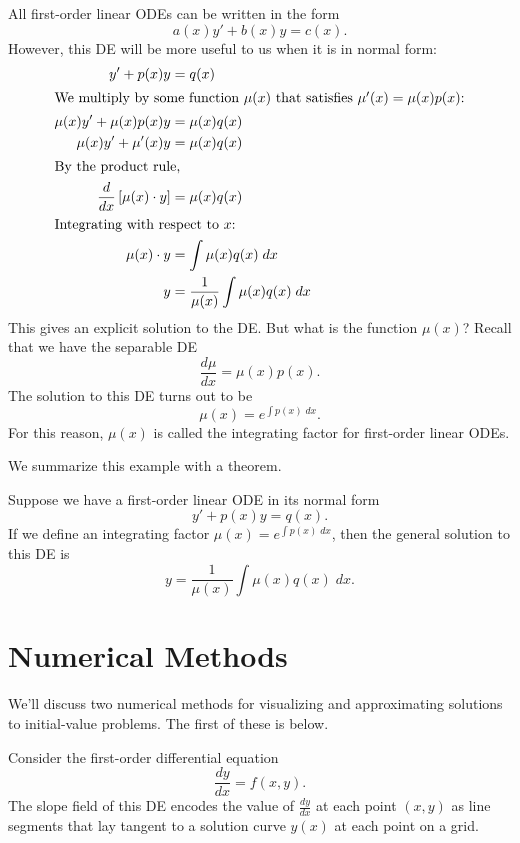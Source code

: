 \documentclass[../m82main.tex]{subfiles}
\begin{document}
\begin{example}
    All first-order linear ODEs can be written in the form
    \[ a(x)y' + b(x)y = c(x). \]
    However, this DE will be more useful to us when it is in normal form:
    \begin{align*}
        y' + p(x)y &= q(x) \\
        \intertext{We multiply by some function $\mu(x)$ that satisfies $\mu'(x) = \mu(x)p(x)$:}
        \mu(x)y' + \mu(x)p(x)y &= \mu(x)q(x) \\
        \mu(x)y' + \mu'(x)y &= \mu(x)q(x) \\
        \intertext{By the product rule,}
        \frac{d}{dx} \left[ \mu(x) \cdot y \right] &= \mu(x)q(x) \\
        \intertext{Integrating with respect to $x$:}
        \mu(x) \cdot y &= \int \mu(x)q(x) \;dx \\
        y &= \frac{1}{\mu(x)} \int \mu(x)q(x) \;dx
    \end{align*}
    This gives an explicit solution to the DE.
    But what is the function $\mu(x)$?
    Recall that we have the separable DE
    \[ \frac{d\mu}{dx} = \mu(x)p(x). \]
    The solution to this DE turns out to be
    \[ \mu(x) = e^{\int p(x) \;dx}. \]
    For this reason, $\mu(x)$ is called the integrating factor for first-order linear ODEs. 
\end{example}

We summarize this example with a theorem.

\begin{theorem}
    Suppose we have a first-order linear ODE in its normal form
    \[ y' + p(x)y = q(x). \]
    If we define an integrating factor $\mu(x) = e^{\int p(x) \;dx}$, then the general solution to this DE is
    \[ y = \frac{1}{\mu(x)} \int \mu(x)q(x) \;dx. \]
\end{theorem}

\section{Numerical Methods}
We'll discuss two numerical methods for visualizing and approximating solutions to initial-value problems.
The first of these is below.

\begin{definition}
Consider the first-order differential equation
\[ \frac{dy}{dx} = f(x, y). \]
The slope field of this DE encodes the value of $\frac{dy}{dx}$ at each point $(x, y)$ as line segments that lay tangent to a solution curve $y(x)$ at each point on a grid.
\end{definition}
\end{document}
